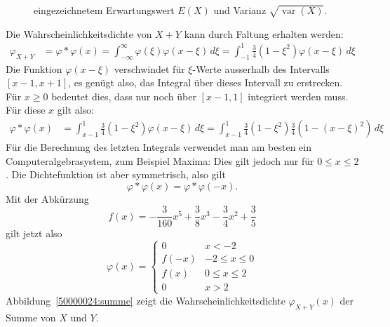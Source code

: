 \begin{loesung}
\begin{teilaufgaben}
\begin{figure}
{eingezeichnetem Erwartungswert $E(X)$ und Varianz $\sqrt{\operatorname{var}(X)}$.
\label{50000024:exvarx}}
\end{figure}
\item
Die Wahrscheinlichkeitsdichte von $X+Y$ kann durch Faltung erhalten werden:
\begin{align*}
\varphi_{X+Y}&=\varphi*\varphi(x)
=\int_{-\infty}^{\infty}\varphi(\xi)\varphi(x-\xi)\,d\xi
=\int_{-1}^1\frac34(1-\xi^2)\varphi(x-\xi)\,d\xi
\end{align*}
Die Funktion $\varphi(x-\xi)$ verschwindet für $\xi$-Werte ausserhalb
des Intervalls $[x-1,x+1]$, es genügt also, das Integral über dieses
Intervall zu erstrecken. Für $x\ge 0$ bedeutet dies, dass nur noch
über $[x-1,1]$ integriert werden muss. Für diese $x$ gilt also:
\begin{align*}
\varphi*\varphi(x)
&=
\int_{x-1}^1 \frac34(1-\xi^2)\varphi(x-\xi)\,d\xi
=
\int_{x-1}^1 \frac34(1-\xi^2)\frac34(1-(x-\xi)^2)\,d\xi
\end{align*}
Für die Berechnung des letzten Integrals verwendet man am besten
ein Computeralgebrasystem, zum Beispiel Maxima:
Dies gilt jedoch nur für $0\le x \le 2$. Die Dichtefunktion ist
aber symmetrisch, also gilt
\[
\varphi*\varphi(x)=\varphi*\varphi(-x).
\]
Mit der Abkürzung
\[
f(x)=-\frac3{160}x^5+\frac38x^3-\frac34x^2+\frac35
\]
gilt jetzt also
\[
\varphi(x)=\begin{cases}
0&x<-2\\
f(-x)&-2\le x\le 0\\
f(x)&0\le x \le 2\\
0&x>2
\end{cases}
\]
Abbildung~\ref{50000024:summe} zeigt die Wahrscheinlichkeitsdichte $\varphi_{X+Y}(x)$
der Summe von $X$ und $Y$.
\qedhere
\begin{figure}
\centering
\def\h{2.5}
\end{figure}
\end{teilaufgaben}
\end{loesung}
